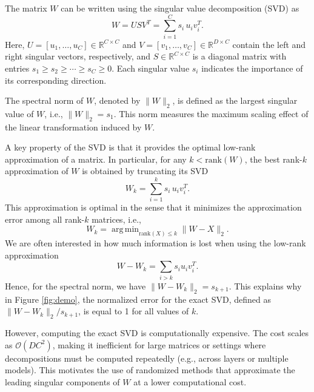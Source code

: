 \documentclass[twoside,leqno,onecolumn]{article}
\DeclareMathOperator*{\argmin}{arg\,min}
\begin{document}
The matrix $W$ can be written using the singular value decomposition (SVD) as
\begin{equation}
W = U S V^T = \sum_{i=1}^C s_i\, u_i v_i^T.
\end{equation}
Here, $U=[u_1,\ldots,u_C] \in \mathbb{R}^{C \times C}$ and $V=[v_1,\ldots,v_C] \in \mathbb{R}^{D \times C}$ contain the left and right singular vectors, respectively, and $S \in \mathbb{R}^{C \times C}$ is a diagonal matrix with entries $s_1 \geq s_2 \geq \cdots \geq s_C \geq 0$. Each singular value $s_i$ indicates the importance of its corresponding direction. %

The spectral norm of $W$, denoted by $\|W\|_2$, is defined as the largest singular value of $W$, i.e., $\|W\|_2 = s_1$. This norm measures the maximum scaling effect of the linear transformation induced by $W$.

A key property of the SVD is that it provides the optimal low-rank approximation of a matrix. In particular, for any $k < \mathrm{rank}(W)$, the best rank-$k$ approximation of $W$ is obtained by truncating its SVD
\begin{equation}
W_k = \sum_{i=1}^k s_i\, u_i v_i^T.
\end{equation}
This approximation is optimal in the sense that it minimizes the approximation error among all rank-$k$ matrices, i.e.,
\begin{equation}
W_k = \argmin_{\mathrm{rank}(X) \leq k} \|W - X\|_2.
\end{equation}
We are often interested in how much information is lost when using the low-rank approximation
\begin{equation}
W - W_k = \sum_{i>k} s_i u_i v_i^T.
\end{equation}
Hence, for the spectral norm, we have $\|W - W_k\|_2 = s_{k+1}$. This explains why in Figure \ref{fig:demo}, the normalized error for the exact SVD, defined as $\|W - W_k\|_2 / s_{k+1}$, is equal to 1 for all values of $k$.

However, computing the exact SVD is computationally expensive. The cost scales as $\mathcal{O}(DC^2 )$, making it inefficient for large matrices or settings where decompositions must be computed repeatedly (e.g., across layers or multiple models). 
 This motivates the use of randomized methods that approximate the leading singular components of $W$ at a lower computational cost.
\end{document}
